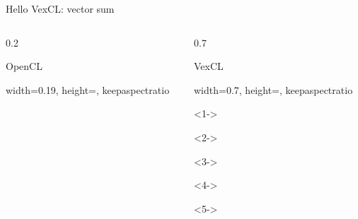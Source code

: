 \documentclass[@BEAMER_OPTIONS@]{beamer}
\begin{document}
\begin{frame}[fragile]{Hello VexCL: vector sum}
\begin{columns}
\begin{column}{0.2\textwidth}
\begin{minipage}[c][\textheight][c]{\linewidth}
\begin{exampleblock}{OpenCL}
\begin{adjustbox}{width=0.19\textwidth, height=\textheight, keepaspectratio}
\begin{minipage}{\textwidth}
\begin{uncoverenv}
                            \end{uncoverenv}
                        \end{minipage}
                    \end{adjustbox}
                \end{exampleblock}
            \end{minipage}
        \end{column}
        \begin{column}{0.7\textwidth}
            \begin{minipage}[c][\textheight][c]{\linewidth}
                \begin{exampleblock}{VexCL}
                    \begin{adjustbox}{width=0.7\textwidth, height=\textheight, keepaspectratio}
                        \begin{minipage}{\textwidth}
                            \begin{uncoverenv}<1->
                                
                            \end{uncoverenv}
                            \begin{uncoverenv}<2->
                                
                            \end{uncoverenv}
                            \begin{uncoverenv}<3->
                                
                            \end{uncoverenv}
                            \begin{uncoverenv}<4->
                                
                            \end{uncoverenv}
                            \begin{uncoverenv}<5->
                                
                            \end{uncoverenv}
                        \end{minipage}
                    \end{adjustbox}
                \end{exampleblock}
            \end{minipage}
        \end{column}
    \end{columns}
\end{frame}
\end{document}
